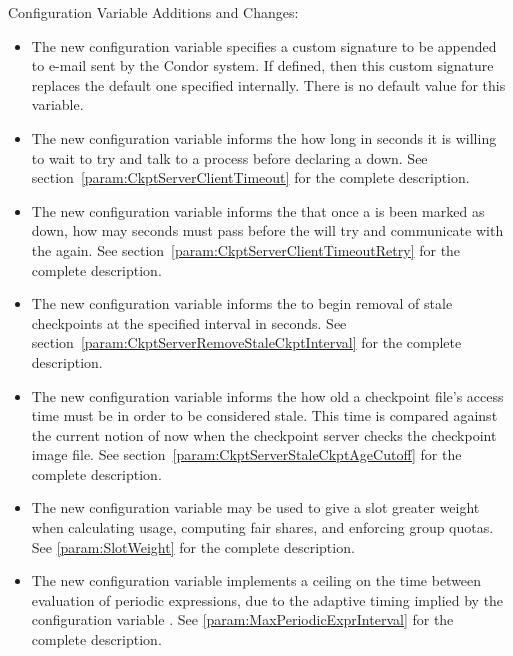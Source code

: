 \noindent Configuration Variable Additions and Changes:

\begin{itemize}

\item The new configuration variable  specifies
a custom signature to be appended to e-mail sent by the Condor system.
If defined, then this custom signature replaces the
default one specified internally.
There is no default value for this variable.

\item The new configuration variable 
informs the  how long in seconds it is willing to wait
to try and talk to a  process before declaring a
 down.
See section~\ref{param:CkptServerClientTimeout} for the complete description.

\item The new configuration variable
 informs the 
that once a  is been marked as down, how may seconds
must pass before the  will try and communicate with the
 again.
See section~\ref{param:CkptServerClientTimeoutRetry} 
for the complete description.

\item The new configuration variable
 informs the
 to begin removal of stale checkpoints at the specified
interval in seconds.
See section~\ref{param:CkptServerRemoveStaleCkptInterval} 
for the complete description.

\item The new configuration variable
 informs the
 how old a checkpoint file's access time must be
in order to be considered stale. This time is compared against the
current notion of now
when the checkpoint server checks the checkpoint image file.
See section~\ref{param:CkptServerStaleCkptAgeCutoff} 
for the complete description.

\item The new configuration variable  may be used to
give a slot greater weight when calculating usage, computing fair
shares, and enforcing group quotas.  
See \ref{param:SlotWeight} for the complete description.

\item The new configuration variable 
  implements a ceiling on the time between evaluation of periodic expressions,
  due to the adaptive timing implied by the configuration variable
  .
  See \ref{param:MaxPeriodicExprInterval} for the complete description.


\end{itemize}
